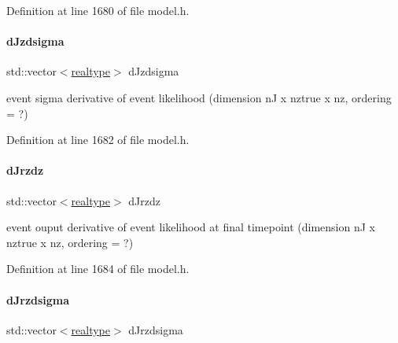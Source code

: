 Definition at line 1680 of file model.\+h.

\mbox{\label{classamici_1_1_model_adb1036c3ad16c2b4c48b71452eab63c7}} 
\paragraph{\texorpdfstring{d\+Jzdsigma}{dJzdsigma}}
{\footnotesize\ttfamily std\+::vector$<$\mbox{\hyperlink{namespaceamici_a1bdce28051d6a53868f7ccbf5f2c14a3}{realtype}}$>$ d\+Jzdsigma\hspace{0.3cm}{\ttfamily [protected]}}

event sigma derivative of event likelihood (dimension nJ x nztrue x nz, ordering = ?) 

Definition at line 1682 of file model.\+h.

\mbox{\label{classamici_1_1_model_a80eade42075bbd373d5531c6fd7cd877}} 
\paragraph{\texorpdfstring{d\+Jrzdz}{dJrzdz}}
{\footnotesize\ttfamily std\+::vector$<$\mbox{\hyperlink{namespaceamici_a1bdce28051d6a53868f7ccbf5f2c14a3}{realtype}}$>$ d\+Jrzdz\hspace{0.3cm}{\ttfamily [protected]}}

event ouput derivative of event likelihood at final timepoint (dimension nJ x nztrue x nz, ordering = ?) 

Definition at line 1684 of file model.\+h.

\mbox{\label{classamici_1_1_model_ad38f72dc10596ffb60d0472dc4b7eade}} 
\paragraph{\texorpdfstring{d\+Jrzdsigma}{dJrzdsigma}}
{\footnotesize\ttfamily std\+::vector$<$\mbox{\hyperlink{namespaceamici_a1bdce28051d6a53868f7ccbf5f2c14a3}{realtype}}$>$ d\+Jrzdsigma\hspace{0.3cm}{\ttfamily [protected]}}

